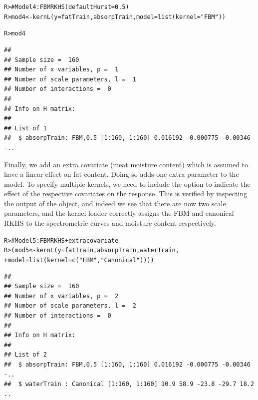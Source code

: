 \documentclass[a4paper,showframe,11pt]{report}\usepackage[]{graphicx}\usepackage[]{color}
\makeatletter
\newcommand{\hlstr}[1]{\textcolor[rgb]{0.063,0.58,0.627}{#1}}%
\newcommand{\hlcom}[1]{\textcolor[rgb]{0.588,0.588,0.588}{#1}}%
\newcommand{\hlstd}[1]{\textcolor[rgb]{0.196,0.196,0.196}{#1}}%
\newcommand{\hlkwb}[1]{\textcolor[rgb]{0.627,0,0.314}{#1}}%
\newcommand{\hlkwc}[1]{\textcolor[rgb]{0,0.631,0.314}{#1}}%
\newcommand{\hlkwd}[1]{\textcolor[rgb]{0.78,0.227,0.412}{#1}}%
\newenvironment{kframe}{%
 \def\at@end@of@kframe{}%
 \ifinner\ifhmode%
  \def\at@end@of@kframe{\end{minipage}}%
  \begin{minipage}{\columnwidth}%
 \fi\fi%
 \def\FrameCommand##1{\hskip\@totalleftmargin \hskip-\fboxsep
 \colorbox{shadecolor}{##1}\hskip-\fboxsep
     \hskip-\linewidth \hskip-\@totalleftmargin \hskip\columnwidth}%
 \MakeFramed {\advance\hsize-\width
   \@totalleftmargin\z@ \linewidth\hsize
   \@setminipage}}%
 {\par\unskip\endMakeFramed%
 \at@end@of@kframe}
\newenvironment{knitrout}{}{} %
\makeatother
\begin{document}
\begin{knitrout}
\color{fgcolor}\begin{kframe}
\begin{alltt}
\hlstd{R> }\hlcom{# Model 4: FBM RKHS (default Hurst = 0.5)}
\hlstd{R> }\hlstd{mod4} \hlkwb{<-} \hlkwd{kernL}\hlstd{(}\hlkwc{y} \hlstd{= fatTrain, absorpTrain,} \hlkwc{model} \hlstd{=} \hlkwd{list}\hlstd{(}\hlkwc{kernel} \hlstd{=} \hlstr{"FBM"}\hlstd{))}
\end{alltt}
\end{kframe}
\end{knitrout}
\begin{knitrout}
\color{fgcolor}\begin{kframe}
\begin{alltt}
\hlstd{R> }\hlstd{mod4}
\end{alltt}
\begin{verbatim}
## 
## Sample size =  160 
## Number of x variables, p =  1 
## Number of scale parameters, l =  1 
## Number of interactions =  0 
## 
## Info on H matrix:
## 
## List of 1
##  $ absorpTrain: FBM,0.5 [1:160, 1:160] 0.016192 -0.000775 -0.00346 -..
\end{verbatim}
\end{kframe}
\end{knitrout}
Finally, we add an extra covariate (meat moisture content) which is assumed to have a linear effect on fat content. Doing so adds one extra parameter to the model. To specify multiple kernels, we need to include the  option  to indicate the effect of the respective covariates on the response. This is verified by inspecting the  output of the  object, and indeed we see that there are now two scale parameters, and the kernel loader correctly assigns the FBM and canonical RKHS to the spectrometric curves and moisture content respectively.

\begin{knitrout}
\color{fgcolor}\begin{kframe}
\begin{alltt}
\hlstd{R> }\hlcom{# Model 5: FBM RKHS + extra covariate}
\hlstd{R> }\hlstd{(mod5} \hlkwb{<-} \hlkwd{kernL}\hlstd{(}\hlkwc{y} \hlstd{= fatTrain, absorpTrain, waterTrain,}
\hlstd{+  }               \hlkwc{model} \hlstd{=} \hlkwd{list}\hlstd{(}\hlkwc{kernel} \hlstd{=} \hlkwd{c}\hlstd{(}\hlstr{"FBM"}\hlstd{,} \hlstr{"Canonical"}\hlstd{))))}
\end{alltt}
\begin{verbatim}
## 
## Sample size =  160 
## Number of x variables, p =  2 
## Number of scale parameters, l =  2 
## Number of interactions =  0 
## 
## Info on H matrix:
## 
## List of 2
##  $ absorpTrain: FBM,0.5 [1:160, 1:160] 0.016192 -0.000775 -0.00346 -..
##  $ waterTrain : Canonical [1:160, 1:160] 10.9 58.9 -23.8 -29.7 18.2 ..
\end{verbatim}
\end{kframe}
\end{knitrout}
\end{document}
